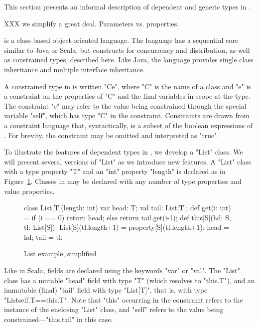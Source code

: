 
This section presents an informal description of 
dependent and generic types in \Xten{}.  

XXX we simplify a great deal.  Parameters vs. properties.

\Xten{} is a class-based object-oriented language.
The language has a sequential core similar to Java or Scala, but
constructs for concurrency and distribution, as well as constrained
types, described here.  Like Java, the language provides single class
inheritance and multiple interface inheritance.

A constrained type in \Xten{} is written \xcd"C{e}", where \xcd"C" is the
name of a class and \xcd"e" is a constraint on the properties of
\xcd"C" and the final variables in scope at the type.  The
constraint \xcd"e" may refer to the value being constrained through
the special variable \xcd"self", which has type \xcd"C" in the
constraint.  Constraints are drawn from a constraint language that,
syntactically, is a subset of the boolean expressions of \Xten{}.  For
brevity, the constraint may be omitted and interpreted as \xcd"true".

To illustrate the features of dependent types in \Xten{}, we develop a \xcd"List"
class.  We will present several versions of \xcd"List" as we
introduce new features.
A \xcd"List" class with a type property \xcd"T" and an \xcd"int"
property \xcd"length" is declared as in Figure~\ref{fig:list0}.
Classes in \Xten{} may be declared with any number of type properties and
value properties.

\begin{figure}
{\footnotesize
\begin{xtennoindent}
class List[T](length: int) {
  var head: T;
  val tail: List[T];
  def get(i: int) = {
    if (i == 0) return head;
    else return tail.get(i-1);
  }
  def this[S](hd: S, tl: List[S]): List[S](tl.length+1) = {
    property[S](tl.length+1);
    head = hd; tail = tl;
  }
}
\end{xtennoindent}
}
\caption{List example, simplified}
\label{fig:list0}
\end{figure}

Like in Scala, fields are declared using the keywords \xcd"var"
or \xcd"val".  The \xcd"List" class has a mutable \xcd"head"
field with type \xcd"T" (which resolves to \xcd"this.T"), and an
immutable (final) \xcd"tail" field with type \xcd"List[T]", that
is, with type \xcd"List{self.T==this.T}".  Note that \xcd"this" occurring
in the constraint refers to the instance of the enclosing
\xcd"List" class,
and \xcd"self" refers to the value being
constrained---\xcd"this.tail" in this case.

